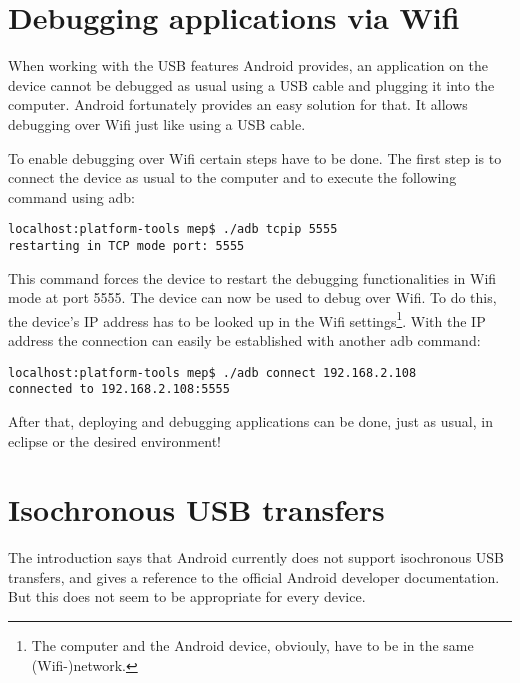 \chapter{Debugging applications via Wifi}
\label{chapter:DetailedDescriptions}

When working with the USB features Android provides, an application on the device cannot be debugged as usual using a USB cable and plugging it into the computer. Android fortunately provides an easy solution for that. It allows debugging over Wifi just like using a USB cable.

To enable debugging over Wifi certain steps have to be done. The first step is to connect the device as usual to the computer and to execute the following command using adb:

\lstset{language=bash}
\begin{lstlisting}[caption=Restarting the device in Wifi debug mode, label=listing:wifi_debug]
localhost:platform-tools mep$ ./adb tcpip 5555
restarting in TCP mode port: 5555
\end{lstlisting}

This command forces the device to restart the debugging functionalities in Wifi mode at port 5555. The device can now be used to debug over Wifi. To do this, the device's IP address has to be looked up in the Wifi settings\footnote{The computer and the Android device, obviouly, have to be in the same (Wifi-)network.}. With the IP address the connection can easily be established with another adb command:

 \begin{lstlisting}[caption=Connecting to the device over Wifi, label=listing:wifi_connect]
localhost:platform-tools mep$ ./adb connect 192.168.2.108
connected to 192.168.2.108:5555
 \end{lstlisting}
 
 After that, deploying and debugging applications can be done, just as usual, in eclipse or the desired environment!

\chapter{Isochronous USB transfers}

The introduction says that Android currently does not support isochronous USB transfers, and gives a reference to the official Android developer documentation\cite{android_usb_constants}. But this does not seem to be appropriate for every device.

